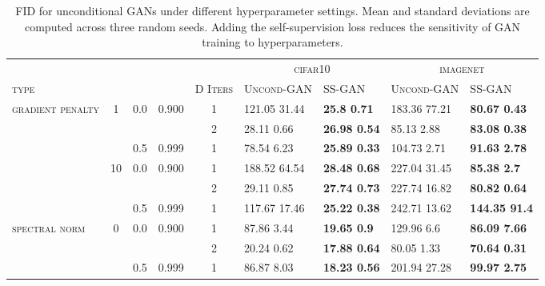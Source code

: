 \documentclass[10pt,twocolumn,letterpaper]{article}
\newcommand{\cifar}{\textsc{cifar10}}
\newcommand{\imagenet}{\textsc{imagenet}}
\begin{document}
{\renewcommand{\arraystretch}{1.2}
\begin{table*}[t]
\small\centering
\caption{\label{tab:gp_robustness_fid}
FID for unconditional GANs under different hyperparameter settings.
Mean and standard deviations are computed across three random seeds.
Adding the self-supervision loss reduces the sensitivity of GAN training to hyperparameters.}
\begin{tabular}{lcllcllll}
\toprule
                 &    &     &       &  & \multicolumn{2}{c}{\cifar{}} & \multicolumn{2}{c}{\imagenet{}} \\
\textsc{type} &  &  &  & \textsc{D Iters} &  \textsc{Uncond-GAN} &          \textsc{SS-GAN} &              \textsc{Uncond-GAN} &           \textsc{SS-GAN}     \\
\midrule
\multirow{6}{*}{\textsc{gradient penalty}} & \multirow{3}{*}{1} & \multirow{2}{*}{0.0} & \multirow{2}{*}{0.900} & 1 &  121.05  31.44 &   \textbf{25.8  0.71} &  183.36  77.21 &   \textbf{80.67  0.43} \\ 
                 &    &     &       & 2 &    28.11  0.66 &  \textbf{26.98  0.54} &    85.13  2.88 &   \textbf{83.08  0.38} \\
                 &    & 0.5 & 0.999 & 1 &    78.54  6.23 &  \textbf{25.89  0.33} &   104.73  2.71 &   \textbf{91.63  2.78} \\ \cline{2-9}
                 & \multirow{3}{*}{10} & \multirow{2}{*}{0.0} & \multirow{2}{*}{0.900} & 1 &  188.52  64.54 &  \textbf{28.48  0.68} &  227.04  31.45 &    \textbf{85.38  2.7} \\
                 &    &     &       & 2 &    29.11  0.85 &  \textbf{27.74  0.73} &  227.74  16.82 &   \textbf{80.82  0.64} \\
                 &    & 0.5 & 0.999 & 1 &  117.67  17.46 &  \textbf{25.22  0.38} &  242.71  13.62 &  \textbf{144.35  91.4} \\
\cline{1-9}
\multirow{3}{*}{\textsc{spectral norm}} & \multirow{3}{*}{0} & \multirow{2}{*}{0.0} & \multirow{2}{*}{0.900} & 1 &    87.86  3.44 &   \textbf{19.65  0.9} &    129.96  6.6 &   \textbf{86.09  7.66} \\ 
                 &    &     &       & 2 &    20.24  0.62 &  \textbf{17.88  0.64} &    80.05  1.33 &   \textbf{70.64  0.31} \\
                 &    & 0.5 & 0.999 & 1 &    86.87  8.03 &  \textbf{18.23  0.56} &  201.94  27.28 &   \textbf{99.97  2.75} \\
\bottomrule
\end{tabular} \end{table*}}
\end{document}
